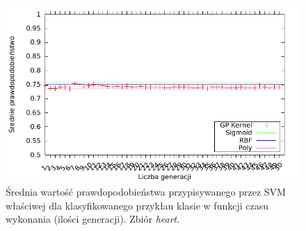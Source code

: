 	\begin{figure}
		\includegraphics[scale=0.90]{figures/results/probability/probability-heart}
		\caption{Średnia wartość prawdopodobieństwa przypisywanego przez SVM właściwej dla klasyfikowanego przykłau klasie w funkcji czasu wykonania (ilości generacji). Zbiór \emph{heart}.\label{fig:probability-heart}}
	\end{figure}

%
	
